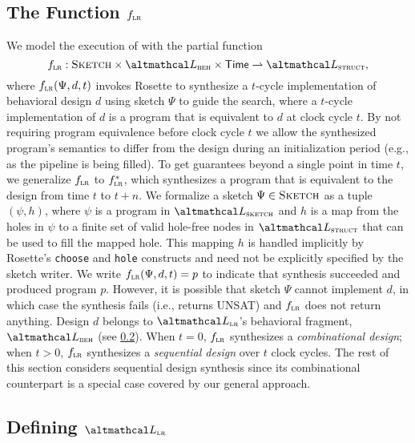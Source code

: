 \subsection{The \lr Function $\text{$f_{\textsc{lr}}$}$}
\label{subsec:the-lr-function}

We model the execution of \lr
  with the partial function
  \small
%
\[\lrfn: \Sketch \times \SpecLang \times \Time \rightharpoonup \ImplLang,\]
%
\normalsize
where $\text{$f_{\textsc{lr}}$}(\Psi, d, t)$
  invokes Rosette
  to synthesize a $t$-cycle
  implementation
  of behavioral design $d$ 
  using sketch $\Psi$ to guide
  the search,
  where a $t$-cycle
  implementation of $d$ is a program
  that is equivalent to $d$ at clock cycle
  $t$.
By not requiring program equivalence before
    clock cycle $t$ we allow the
    synthesized program's semantics to
    differ from the design during 
    an initialization period
    (e.g., as the pipeline is being filled).
To get guarantees beyond a single
    point in time $t$, we generalize
    $\text{$f_{\textsc{lr}}$}$ to $\text{$f_{\textsc{lr}}^{*}$}$,
    which synthesizes a program
    that is equivalent to the design
    from time $t$ to $t + n$.
We formalize a sketch $\Psi \in \textsc{Sketch}$  as a tuple
  $(\psi, h)$,
  where $\psi$ is a program in $\SketchLang$ 
  and $h$ is a map
  from the holes in $\psi$
  to a finite set of valid hole-free
  nodes in $\ImplLang$
  that can be used to fill
  the mapped hole.
This mapping $h$ is handled implicitly by Rosette's
  \texttt{choose} and \texttt{hole} constructs and
  need not be explicitly specified by the
  sketch writer.
We write $\text{$f_{\textsc{lr}}$}(\Psi, d, t) = p$ to 
    indicate that synthesis succeeded and produced
    \lr{} program $p$.
However, it is possible that sketch $\Psi$
    cannot implement $d$, in which case
    the synthesis fails
    (i.e., returns UNSAT)
    and
    $\text{$f_{\textsc{lr}}$}$ does not return anything.
Design $d$ belongs to 
  $\UberLang$'s behavioral fragment,
  $\SpecLang$ (see
  \cref{subsec:lrir-syntax-and-semantics}).
%
When $t = 0$, $\text{$f_{\textsc{lr}}$}$ 
  synthesizes a 
  \textit{combinational design}; when 
$t > 0$, $\text{$f_{\textsc{lr}}$}$ 
  synthesizes a \textit{sequential design}
  over $t$ clock cycles.
The rest of this section 
  considers sequential design synthesis 
  since its combinational counterpart is 
  a special case covered
  by our general approach.
  
  
\subsection{Defining $\UberLang$}
\label{subsec:lrir-syntax-and-semantics}

